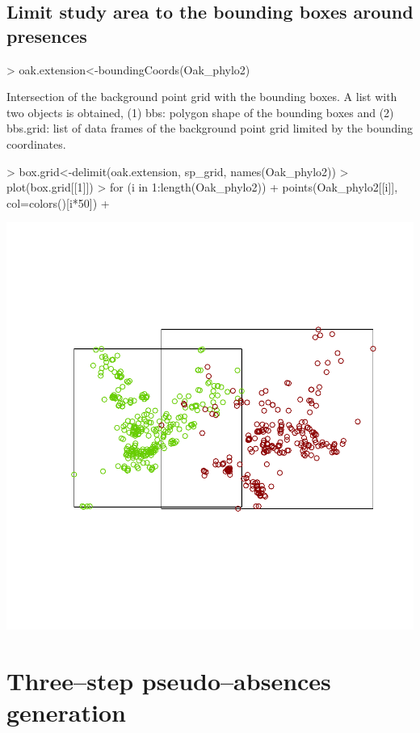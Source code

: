 \documentclass[10pt,a4paper]{report}
\begin{document}
\section{Limit study area to the bounding boxes around presences}

\begin{Schunk}
\begin{Sinput}
>  oak.extension<-boundingCoords(Oak_phylo2)
\end{Sinput}
\end{Schunk}

Intersection of the background point grid with the bounding boxes. A list with two objects is obtained, (1) bbs: polygon shape of the bounding boxes and (2) bbs.grid: list of data frames of the background point grid limited by the bounding coordinates.


\begin{Schunk}
\begin{Sinput}
> box.grid<-delimit(oak.extension, sp_grid, names(Oak_phylo2))
> plot(box.grid[[1]])
> for (i in 1:length(Oak_phylo2)){
+   points(Oak_phylo2[[i]], col=colors()[i*50])
+ }
\end{Sinput}
\end{Schunk}
\includegraphics{mopa-mopa6}


\chapter{Three--step pseudo--absences generation}
\end{document}
